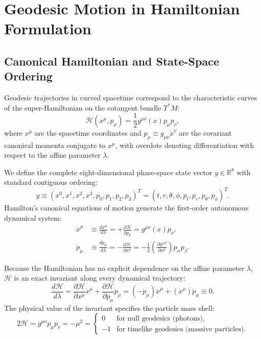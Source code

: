 \section{Geodesic Motion in Hamiltonian Formulation}
\label{sec:hamiltonian_dynamics}

\subsection{Canonical Hamiltonian and State-Space Ordering}
Geodesic trajectories in curved spacetime correspond to the characteristic curves of the super-Hamiltonian on the cotangent bundle $T^*M$:
\begin{equation}
    \mathcal{H}(x^\mu, p_\mu) = \frac{1}{2} g^{\mu\nu}(x) p_\mu p_\nu,
    \label{eq:super_hamiltonian}
\end{equation}
where $x^\mu$ are the spacetime coordinates and $p_\mu \equiv g_{\mu\nu} \dot{x}^\nu$ are the covariant canonical momenta conjugate to $x^\mu$, with overdots denoting differentiation with respect to the affine parameter $\lambda$.

We define the complete eight-dimensional phase-space state vector $y \in \mathbb{R}^8$ with standard contiguous ordering:
\begin{equation}
    y \equiv \left(x^0, x^1, x^2, x^3, p_0, p_1, p_2, p_3\right)^T = \left(t, r, \theta, \phi, p_t, p_r, p_\theta, p_\phi\right)^T.
    \label{eq:state_vector_def}
\end{equation}
Hamilton's canonical equations of motion generate the first-order autonomous dynamical system:
\begin{align}
    \dot{x}^\mu &\equiv \frac{dx^\mu}{d\lambda} = +\frac{\partial \mathcal{H}}{\partial p_\mu} = g^{\mu\nu}(x) p_\nu, \label{eq:hamilton_x_dot} \\
    \dot{p}_\mu &\equiv \frac{dp_\mu}{d\lambda} = -\frac{\partial \mathcal{H}}{\partial x^\mu} = -\frac{1}{2} \left(\frac{\partial g^{\alpha\beta}}{\partial x^\mu}\right) p_\alpha p_\beta. \label{eq:hamilton_p_dot}
\end{align}

Because the Hamiltonian has no explicit dependence on the affine parameter $\lambda$, $\mathcal{H}$ is an exact invariant along every dynamical trajectory:
\begin{equation}
    \frac{d\mathcal{H}}{d\lambda} = \frac{\partial \mathcal{H}}{\partial x^\mu}\dot{x}^\mu + \frac{\partial \mathcal{H}}{\partial p_\mu}\dot{p}_\mu = \left(-\dot{p}_\mu\right)\dot{x}^\mu + \left(\dot{x}^\mu\right)\dot{p}_\mu \equiv 0.
\end{equation}
The physical value of the invariant specifies the particle mass shell:
\begin{equation}
    2\mathcal{H} = g^{\mu\nu} p_\mu p_\nu = -\mu^2 = 
    \begin{cases}
        0 & \text{for null geodesics (photons)}, \\
        -1 & \text{for timelike geodesics (massive particles)}.
    \end{cases}
    \label{eq:dispersion_relation}
\end{equation}


